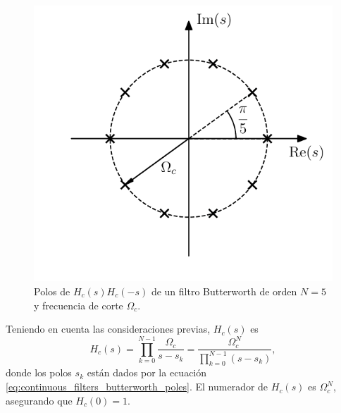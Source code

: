 \documentclass[a4paper]{report}
\begin{document}
\begin{figure}[!htb]
  \begin{minipage}[c]{0.45\textwidth}
    \includegraphics[width=\textwidth]{figuras/continuous_filters_butterworth_poles.pdf}
  \end{minipage}\hfill
  \begin{minipage}[c]{0.45\textwidth}
    \caption{
      Polos de \(H_c(s)H_c(-s)\) de un filtro Butterworth de orden \(N=5\) y frecuencia de corte \(\Omega_c\).
    }\label{fig:continuous_filters_butterworth_poles}
  \end{minipage}
\end{figure}

Teniendo en cuenta las consideraciones previas, \(H_c(s)\) es
\begin{equation}\label{eq:continuous_filters_butterworth_transfer_function}
 H_c(s)=\prod_{k=0}^{N-1}\frac{\Omega_c}{s-s_k}
  =\frac{\Omega_c^N}{\displaystyle\prod_{k=0}^{N-1}(s-s_k)},
\end{equation}
donde los polos \(s_k\) están dados por la ecuación \ref{eq:continuous_filters_butterworth_poles}. El numerador de \(H_c(s)\) es \(\Omega_c^N\), asegurando que \(H_c(0)=1\).
\end{document}
